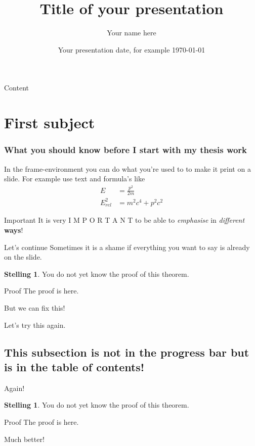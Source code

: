 \documentclass{beamer}
\title{Title of your presentation}
\date{Your presentation date, for example \today}
\author{Your name here}
\theoremstyle{definition}
\theoremstyle{example}
\newtheorem{thm}[dfn]{Stelling}%
\begin{document}
	
	\begin{frame}
		\titlepage
	\end{frame}	
	
	\begin{frame}{Content}%
		\tableofcontents
	\end{frame}
	
	\section{First subject}
	
	\begin{frame}
		\frametitle{What you should know before I start with my thesis work}
		In the frame-environment you can do what you're used to to make it print on a slide. For example use text and formula's like
		\begin{align}
			E &= \frac{p^2}{2m}\\
			E_{rel}^2 &= m^2c^4 + p^2c^2
		\end{align}
		\begin{block}{Important}
			It is very   I M P O R T A N T   to be able to \emph{emphasise} in \textit{different} \textbf{ways}!
		\end{block}
	\end{frame}


\begin{frame}{Let's continue}
Sometimes it is a shame if everything you want to say is already on the slide.\newline
\begin{thm}
	You do not yet know the proof of this theorem.
\end{thm}
\begin{block}{Proof}
	The proof is here.
\end{block}
But we can fix this!

Let's try this again.

\end{frame}

\subsection{This subsection is not in the progress bar but is in the table of contents!}

\begin{frame}{Again!}
\begin{thm}
	You do not yet know the proof of this theorem.
\end{thm}
\pause
\begin{block}{Proof}
	The proof is here.
\end{block}
\pause
Much better!
\end{frame}
\end{document}
